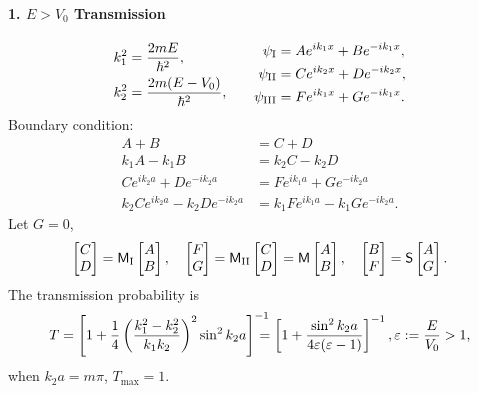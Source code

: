 \documentclass{article}
\newcommand{\ko}[1]{\hspace{-#1 pt}}%
\begin{document}
\paragraph{1. $E>V_0$ Transmission}
\begin{align*}
	\begin{aligned}
		k_1^2 & =\frac{2mE}{\hbar^2},       \\
		k_2^2 & =\frac{2m(E-V_0)}{\hbar^2},
	\end{aligned}\qquad
	\begin{aligned}
		\psi_{\rm I}   & =Ae^{ik_1x}+Be^{-ik_1x}, \\
		\psi_{\rm II}  & =Ce^{ik_2x}+De^{-ik_2x}, \\
		\psi_{\rm III} & =Fe^{ik_1x}+Ge^{-ik_1x}.
	\end{aligned}
\end{align*}
Boundary condition:
\begin{align*}
	A+B                          & =C+D                           \\
	k_1A-k_1B                    & =k_2C-k_2D                     \\
	Ce^{ik_2a}+De^{-ik_2a}       & =Fe^{ik_1a}+Ge^{-ik_2a}        \\
	k_2Ce^{ik_2a}-k_2De^{-ik_2a} & =k_1Fe^{ik_1a}-k_1Ge^{-ik_2a}.
\end{align*}
Let $G=0$,
\begin{align*}
	\begin{bmatrix}C\\D\end{bmatrix}=\mathsf M_{\rm I}
	\begin{bmatrix}A\\B\end{bmatrix},\quad
	\begin{bmatrix}F\\G\end{bmatrix}=\mathsf M_{\rm II}
	\begin{bmatrix}C\\D\end{bmatrix}=\mathsf M
	\begin{bmatrix}A\\B\end{bmatrix},\quad
	\begin{bmatrix}B\\F\end{bmatrix}=\mathsf S
	\begin{bmatrix}A\\G\end{bmatrix}.
\end{align*}
The transmission probability is
$$T=\left[1+\frac14\left(\frac{k_1^2-k_2^2}{k_1k_2}\right)^2\sin^2k_2a\right]^{-1}\ko{10}=\left[1+\frac{\sin^2k_2a}{4\varepsilon(\varepsilon-1)}\right]^{-1},\varepsilon:=\frac E{V_0}>1,$$
when $k_2a=m\pi$, $T_{\max}=1$.
\end{document}
